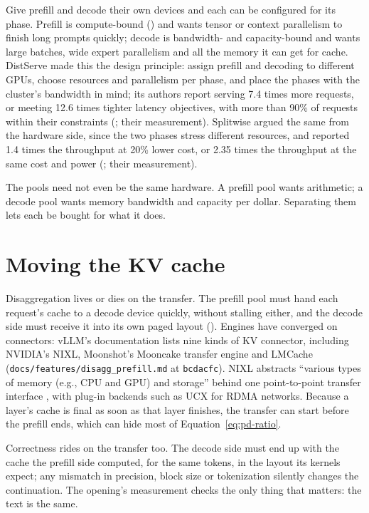 Give prefill and decode their own devices and each can be configured for its
phase. Prefill is compute-bound () and wants tensor or
context parallelism to finish long prompts quickly; decode is bandwidth- and
capacity-bound and wants large batches, wide expert parallelism and all the
memory it can get for cache. DistServe made this the design principle: assign
prefill and decoding to different GPUs, choose resources and parallelism per
phase, and place the phases with the cluster's bandwidth in mind; its authors
report serving 7.4 times more requests, or meeting 12.6 times tighter latency
objectives, with more than 90\% of requests within their constraints
(\cite{zhong2024distserve}; their measurement). Splitwise argued the same from
the hardware side, since the two phases stress different resources, and
reported 1.4 times the throughput at 20\% lower cost, or 2.35 times the
throughput at the same cost and power (\cite{patel2023splitwise}; their
measurement).

The pools need not even be the same hardware. A prefill pool wants arithmetic;
a decode pool wants memory bandwidth and capacity per dollar. Separating them
lets each be bought for what it does.

\section{Moving the KV cache}

Disaggregation lives or dies on the transfer. The prefill pool must hand each
request's cache to a decode device quickly, without stalling either, and the
decode side must receive it into its own paged layout ().
Engines have converged on connectors: vLLM's documentation lists nine kinds of
KV connector, including NVIDIA's NIXL, Moonshot's Mooncake transfer engine and
LMCache (\texttt{docs/features/disagg\_prefill.md} at \texttt{bcdacfc}). NIXL
abstracts ``various types of memory (e.g., CPU and GPU) and storage'' behind one
point-to-point transfer interface \cite{nvidia2026nixl}, with plug-in backends
such as UCX for RDMA networks. Because a layer's cache is final as soon as that
layer finishes, the transfer can start before the prefill ends, which can hide
most of Equation~\ref{eq:pd-ratio}.

Correctness rides on the transfer too. The decode side must end up with the
cache the prefill side computed, for the same tokens, in the layout its kernels
expect; any mismatch in precision, block size or tokenization silently changes
the continuation. The opening's measurement checks the only thing that matters:
the text is the same.

